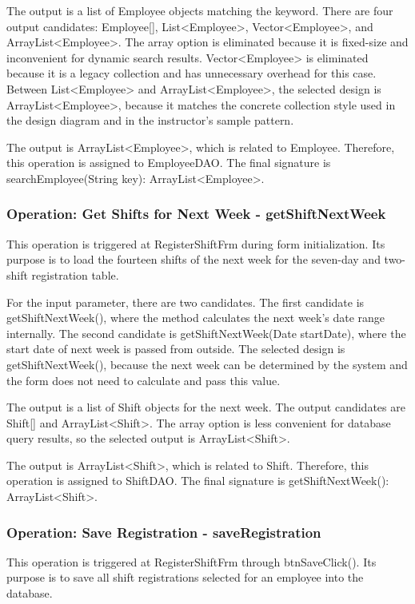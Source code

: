 The output is a list of Employee objects matching the keyword. There are four output candidates: Employee[], List<Employee>, Vector<Employee>, and ArrayList<Employee>. The array option is eliminated because it is fixed-size and inconvenient for dynamic search results. Vector<Employee> is eliminated because it is a legacy collection and has unnecessary overhead for this case. Between List<Employee> and ArrayList<Employee>, the selected design is ArrayList<Employee>, because it matches the concrete collection style used in the design diagram and in the instructor's sample pattern.

The output is ArrayList<Employee>, which is related to Employee. Therefore, this operation is assigned to EmployeeDAO. The final signature is searchEmployee(String key): ArrayList<Employee>.

\subsubsection{Operation: Get Shifts for Next Week - getShiftNextWeek}

This operation is triggered at RegisterShiftFrm during form initialization. Its purpose is to load the fourteen shifts of the next week for the seven-day and two-shift registration table.

For the input parameter, there are two candidates. The first candidate is getShiftNextWeek(), where the method calculates the next week's date range internally. The second candidate is getShiftNextWeek(Date startDate), where the start date of next week is passed from outside. The selected design is getShiftNextWeek(), because the next week can be determined by the system and the form does not need to calculate and pass this value.

The output is a list of Shift objects for the next week. The output candidates are Shift[] and ArrayList<Shift>. The array option is less convenient for database query results, so the selected output is ArrayList<Shift>.

The output is ArrayList<Shift>, which is related to Shift. Therefore, this operation is assigned to ShiftDAO. The final signature is getShiftNextWeek(): ArrayList<Shift>.

\subsubsection{Operation: Save Registration - saveRegistration}

This operation is triggered at RegisterShiftFrm through btnSaveClick(). Its purpose is to save all shift registrations selected for an employee into the database.

